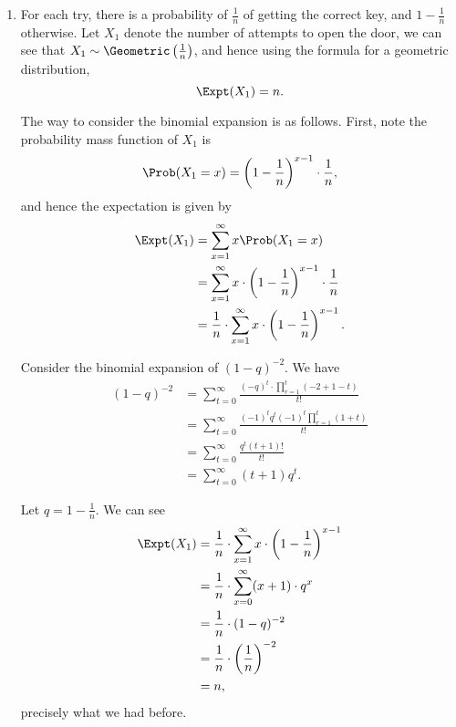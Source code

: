 \Question{\currfilebase}

\begin{enumerate}
    \item For each try, there is a probability of \(\frac{1}{n}\) of getting the correct key, and \(1 - \frac{1}{n}\) otherwise. Let \(X_1\) denote the number of attempts to open the door, we can see that \(X_1 \sim \Geometric\left(\frac{1}{n}\right)\), and hence using the formula for a  geometric distribution,
          \[
              \Expt(X_1) = n.
          \]

          The way to consider the binomial expansion is as follows. First, note the probability mass function of \(X_1\) is
          \[
              \Prob(X_1 = x) = \left(1 - \frac{1}{n}\right)^{x - 1} \cdot \frac{1}{n},
          \]
          and hence the expectation is given by
          \begin{align*}
              \Expt(X_1) & = \sum_{x = 1}^{\infty} x \Prob(X_1 = x)                                                \\
                         & = \sum_{x = 1}^{\infty} x \cdot \left(1 - \frac{1}{n}\right)^{x - 1} \cdot \frac{1}{n}  \\
                         & = \frac{1}{n} \cdot \sum_{x = 1}^{\infty} x \cdot \left(1 - \frac{1}{n}\right)^{x - 1}.
          \end{align*}

          Consider the binomial expansion of \((1 - q)^{-2}\). We have
          \begin{align*}
              (1 - q)^{-2} & = \sum_{t = 0}^{\infty} \frac{(-q)^t \cdot \prod_{r = 1}^{t} (-2 + 1 - t)}{t!} \\
                           & = \sum_{t = 0}^{\infty} \frac{(-1)^t q^t (-1)^t \prod_{r = 1}^{t} (1 + t)}{t!} \\
                           & = \sum_{t = 0}^{\infty} \frac{q^t (t + 1)!}{t!}                                \\
                           & = \sum_{t = 0}^{\infty} (t + 1) q^t.
          \end{align*}

          Let \(q = 1 - \frac{1}{n}\). We can see
          \begin{align*}
              \Expt(X_1) & = \frac{1}{n} \cdot \sum_{x = 1}^{\infty} x \cdot \left(1 - \frac{1}{n}\right)^{x - 1} \\
                         & = \frac{1}{n} \cdot \sum_{x = 0}^{\infty} (x + 1) \cdot q^x                            \\
                         & = \frac{1}{n} \cdot (1 - q)^{-2}                                                       \\
                         & = \frac{1}{n} \cdot \left(\frac{1}{n}\right)^{-2}                                      \\
                         & = n,
          \end{align*}
          precisely what we had before.


\end{enumerate}
